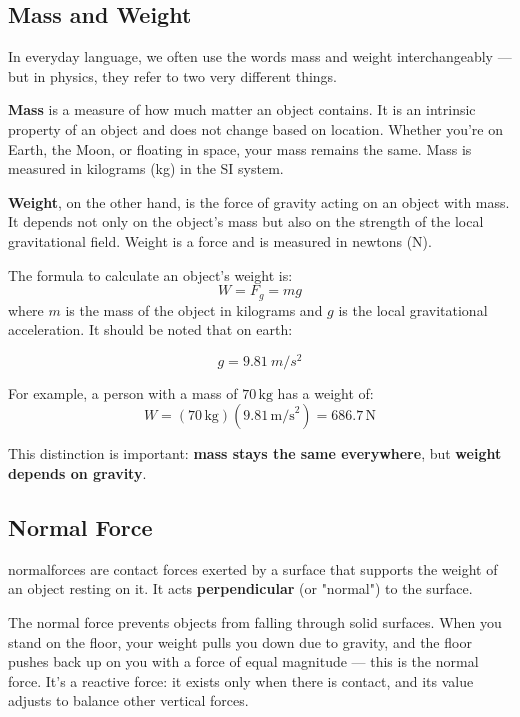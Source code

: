 	\subsection{Mass and Weight}
	In everyday language, we often use the words \gls{mass} and \gls{weight} interchangeably — but in physics, they refer to two very different things.
	
	\textbf{Mass} is a measure of how much matter an object contains. It is an intrinsic property of an object and does not change based on location. Whether you're on Earth, the Moon, or floating in space, your mass remains the same. Mass is measured in kilograms (kg) in the SI system.
	
	\textbf{Weight}, on the other hand, is the force of gravity acting on an object with mass. It depends not only on the object’s mass but also on the strength of the local gravitational field. Weight is a force and is measured in newtons (N).
	
	The formula to calculate an object's weight is:
	\[
	W = F_g = mg
	\]
	where \( m \) is the mass of the object in kilograms and \( g \) is the local gravitational acceleration.  It should be noted that on earth:
	
			\begin{mdframed}[backgroundcolor=green!20!white]
		\begin{equation*}
			g  = \SI{9.81}{m/s^2}
			\label{constant:gearth}
		\end{equation*}
	\end{mdframed}	
	
	For example, a person with a mass of \( 70 \, \text{kg} \) has a weight of:
	\[
	W = (70 \, \text{kg})(9.81 \, \text{m/s}^2) = 686.7 \, \text{N}
	\]
	
	This distinction is important: \textbf{mass stays the same everywhere}, but \textbf{weight depends on gravity}.
	
	
	 \subsection{Normal Force}
	 \gls{normalforce}s are contact forces exerted by a surface that supports the weight of an object resting on it. It acts \textbf{perpendicular} (or "normal") to the surface.
	 
	 The normal force prevents objects from falling through solid surfaces. When you stand on the floor, your weight pulls you down due to gravity, and the floor pushes back up on you with a force of equal magnitude — this is the normal force. It’s a reactive force: it exists only when there is contact, and its value adjusts to balance other vertical forces.
	 
